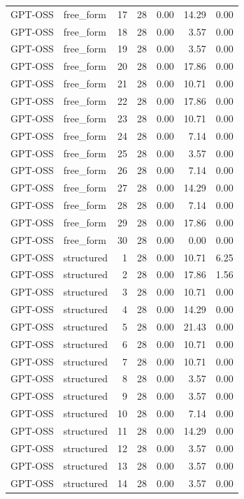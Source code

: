 \begin{longtable}{llrrrrr}
GPT-OSS & free\_form & 17 & 28 & 0.00 & 14.29 & 0.00 \\
GPT-OSS & free\_form & 18 & 28 & 0.00 & 3.57 & 0.00 \\
GPT-OSS & free\_form & 19 & 28 & 0.00 & 3.57 & 0.00 \\
GPT-OSS & free\_form & 20 & 28 & 0.00 & 17.86 & 0.00 \\
GPT-OSS & free\_form & 21 & 28 & 0.00 & 10.71 & 0.00 \\
GPT-OSS & free\_form & 22 & 28 & 0.00 & 17.86 & 0.00 \\
GPT-OSS & free\_form & 23 & 28 & 0.00 & 10.71 & 0.00 \\
GPT-OSS & free\_form & 24 & 28 & 0.00 & 7.14 & 0.00 \\
GPT-OSS & free\_form & 25 & 28 & 0.00 & 3.57 & 0.00 \\
GPT-OSS & free\_form & 26 & 28 & 0.00 & 7.14 & 0.00 \\
GPT-OSS & free\_form & 27 & 28 & 0.00 & 14.29 & 0.00 \\
GPT-OSS & free\_form & 28 & 28 & 0.00 & 7.14 & 0.00 \\
GPT-OSS & free\_form & 29 & 28 & 0.00 & 17.86 & 0.00 \\
GPT-OSS & free\_form & 30 & 28 & 0.00 & 0.00 & 0.00 \\
GPT-OSS & structured & 1 & 28 & 0.00 & 10.71 & 6.25 \\
GPT-OSS & structured & 2 & 28 & 0.00 & 17.86 & 1.56 \\
GPT-OSS & structured & 3 & 28 & 0.00 & 10.71 & 0.00 \\
GPT-OSS & structured & 4 & 28 & 0.00 & 14.29 & 0.00 \\
GPT-OSS & structured & 5 & 28 & 0.00 & 21.43 & 0.00 \\
GPT-OSS & structured & 6 & 28 & 0.00 & 10.71 & 0.00 \\
GPT-OSS & structured & 7 & 28 & 0.00 & 10.71 & 0.00 \\
GPT-OSS & structured & 8 & 28 & 0.00 & 3.57 & 0.00 \\
GPT-OSS & structured & 9 & 28 & 0.00 & 3.57 & 0.00 \\
GPT-OSS & structured & 10 & 28 & 0.00 & 7.14 & 0.00 \\
GPT-OSS & structured & 11 & 28 & 0.00 & 14.29 & 0.00 \\
GPT-OSS & structured & 12 & 28 & 0.00 & 3.57 & 0.00 \\
GPT-OSS & structured & 13 & 28 & 0.00 & 3.57 & 0.00 \\
GPT-OSS & structured & 14 & 28 & 0.00 & 3.57 & 0.00 \\

\end{longtable}
